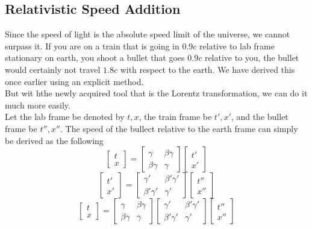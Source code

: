 \documentclass[12pt]{book}
\begin{document}
\subsection{Relativistic Speed Addition}
Since the speed of light is the absolute speed limit of the universe, we cannot surpass it. If you are on a train that is going in $0.9c$ relative to lab frame stationary on earth, you shoot a bullet that goes $0.9c$ relative to you, the bullet would certainly not travel $1.8c$ with respect to the earth. We have derived this once earlier using an explicit method.\\
\newline
But wit hthe newly acquired tool that is the Lorentz transformation, we can do it much more easily.\\
\newline
Let the lab frame be denoted by $t,x$, the train frame be $t',x'$, and the bullet frame be $t'', x''$. The speed of the bullect relative to the earth frame can simply be derived as the following
\[
\begin{bmatrix}
    t \\ x
\end{bmatrix}
=
\begin{bmatrix}
    \gamma      &   \beta\gamma   \\
    \beta\gamma &   \gamma
\end{bmatrix}
\begin{bmatrix}
    t'\\ x'
\end{bmatrix}
\]
\[
\begin{bmatrix}
    t' \\ x'
\end{bmatrix}
=
\begin{bmatrix}
    \gamma'      &   \beta'\gamma'   \\
    \beta'\gamma' &   \gamma'
\end{bmatrix}
\begin{bmatrix}
    t''\\ x''
\end{bmatrix}
\]
\[
\begin{bmatrix}
    t\\ x
\end{bmatrix}
=
\begin{bmatrix}
    \gamma      &   \beta\gamma   \\
    \beta\gamma &   \gamma
\end{bmatrix}
\begin{bmatrix}
    \gamma'      &   \beta'\gamma'   \\
    \beta'\gamma' &   \gamma'
\end{bmatrix}
\begin{bmatrix}
    t''\\ x''
\end{bmatrix}
\]
\end{document}
